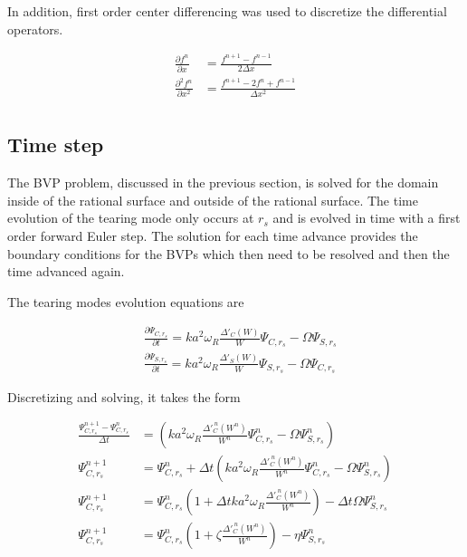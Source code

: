 \documentclass{article}
\begin{document}
In addition, first order center differencing was used to discretize the differential operators.  

\begin{equation} \label{eq3}
\begin{split}
 \frac{\partial f^n}{\partial x} & = \frac{f^{n+1}-f^{n-1}}{2\Delta x} \\
 \frac{\partial^2 f^n}{\partial x^2} & = \frac{f^{n+1}-2f^n+f^{n-1}}{\Delta x^2} \\
\end{split} 
\end{equation} 


\subsection{Time step}

The BVP problem, discussed in the previous section, is solved for the domain inside of the rational surface and outside of the rational surface.  The time evolution of the tearing mode only occurs at $r_s$ and is evolved in time with a first order forward Euler step.  The solution for each time advance provides the boundary conditions for the BVPs which then need to be resolved and then the time advanced again.  

The tearing modes evolution equations are

\begin{equation} \label{eq3}
\begin{split}
 & \frac{\partial \Psi_{C,r_s}}{\partial t} =k a^2 \omega_R \frac{\Delta'_C(W)}{W}\Psi_{C,r_s}-\Omega \Psi_{S,r_s} \\
  & \frac{\partial \Psi_{S,r_s}}{\partial t} =k a^2 \omega_R \frac{\Delta'_S(W)}{W}\Psi_{S,r_s}-\Omega \Psi_{C,r_s}
\end{split} 
\end{equation} 

Discretizing and solving, it takes the form


\begin{equation} \label{eq3}
\begin{split}
\frac{\Psi_{C,r_s}^{n+1}-\Psi_{C,r_s}^{n}}{\Delta t} &=\left( k a^2 \omega_R \frac{\Delta'^{\ n}_{C}(W^n)}{W^n}\Psi_{C,r_s}^n-\Omega \Psi_{S,r_s}^n  \right ) \\
\Psi_{C,r_s}^{n+1} &=\Psi_{C,r_s}^{n}+\Delta t \left( k a^2 \omega_R \frac{\Delta'^{\ n}_C(W^{n})}{W^{n}}\Psi_{C,r_s}^{n}-\Omega \Psi_{S,r_s}^{n} \right )  \\ 
\Psi_{C,r_s}^{n+1} &=\Psi_{C,r_s}^{n}\left( 1 + \Delta t  k a^2 \omega_R \frac{\Delta'^{\ n}_C(W^{n})}{W^{n}}\right) - \Delta t \Omega \Psi_{S,r_s}^{n}   \\
\Psi_{C,r_s}^{n+1} &=\Psi_{C,r_s}^{n}\left( 1 + \zeta \frac{\Delta'^{\ n}_C(W^{n})}{W^{n}}\right) - \eta \Psi_{S,r_s}^{n}   \\
\end{split} 
\end{equation} 
\end{document}

